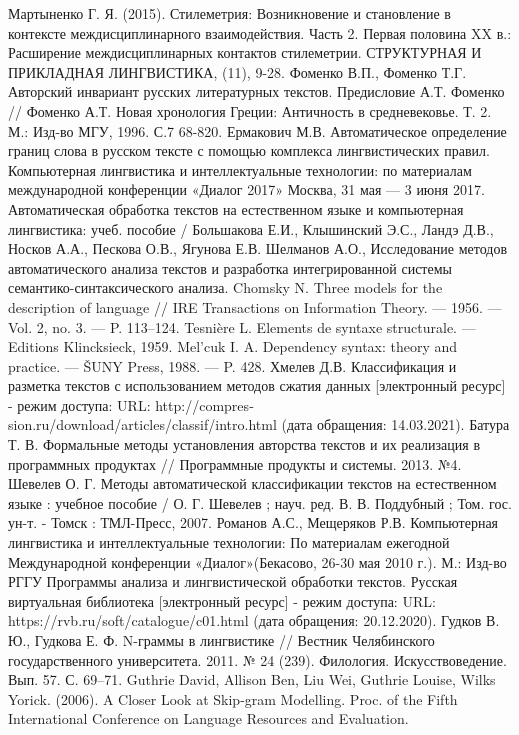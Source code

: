 \documentclass[utf8x, 14pt]{G7-32} %
\begin{document}
\begin{thebibliography}{}
 Мартыненко Г. Я. (2015). Стилеметрия: Возникновение и становление в контексте междисциплинарного взаимодействия. Часть 2. Первая половина XX в.: Расширение междисциплинарных контактов стилеметрии. СТРУКТУРНАЯ И ПРИКЛАДНАЯ ЛИНГВИСТИКА, (11), 9-28.
 Фоменко В.П., Фоменко Т.Г. Авторский инвариант русских литературных текстов. Предисловие А.Т. Фоменко // Фоменко А.Т. Новая хронология Греции: Античность в средневековье. Т. 2. М.: Изд-во МГУ, 1996. С.7 68-820.
 Ермакович М.В. Автоматическое определение границ слова в русском тексте с помощью комплекса лингвистических правил. Компьютерная лингвистика и интеллектуальные технологии: по материалам международной конференции «Диалог 2017» Москва, 31 мая — 3 июня 2017.
 Автоматическая обработка текстов на естественном языке и компьютерная лингвистика: учеб. пособие / Большакова Е.И., Клышинский Э.С., Ландэ Д.В., Носков А.А., Пескова О.В., Ягунова Е.В.
 Шелманов А.О., Исследование методов автоматического анализа текстов и разработка интегрированной системы семантико-синтаксического анализа.
 Chomsky N. Three models for the description of language // IRE Transactions on Information Theory. — 1956. — Vol. 2, no. 3. — P. 113–124.
 Tesnière L. Elements de syntaxe structurale. — Editions Klincksieck, 1959.
 Mel’cuk I. A. Dependency syntax: theory and practice. — ŠUNY Press, 1988. — P. 428.
 Хмелев Д.В. Классификация и разметка текстов с использованием методов сжатия данных [электронный ресурс] - режим доступа: URL: http://compres­sion.ru/download/articles/classif/intro.html (дата обращения: 14.03.2021).
 Батура Т. В. Формальные методы установления авторства текстов и их реализация в программных продуктах // Программные продукты и системы. 2013. №4. 
 Шевелев О. Г. Методы автоматической классификации текстов на естественном языке : учебное пособие / О. Г. Шевелев ; науч. ред. В. В. Поддубный ; Том. гос. ун-т. - Томск : ТМЛ-Пресс, 2007. 
 Романов А.С., Мещеряков Р.В. Компьютерная лингвистика и интеллектуальные технологии: По материалам ежегодной Международной конференции «Диалог»(Бекасово, 26-30 мая 2010 г.). М.: Изд-во РГГУ
 Программы анализа и лингвистической обработки текстов. Русская виртуальная библиотека [электронный ресурс] - режим доступа: URL: https://rvb.ru/soft/catalogue/c01.html (дата обращения: 20.12.2020).
 Гудков В. Ю., Гудкова Е. Ф. N-граммы в лингвистике // Вестник Челябинского государственного университета. 2011. № 24 (239). Филология. Искусствоведение. Вып. 57. С. 69–71.
 Guthrie David, Allison Ben, Liu Wei, Guthrie Louise, Wilks Yorick. (2006). A Closer Look at Skip-gram Modelling. Proc. of the Fifth International Conference on Language Resources and Evaluation. 
\end{thebibliography}
\end{document}
